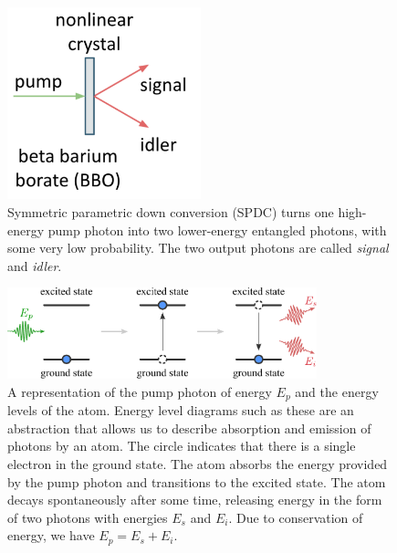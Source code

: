 \begin{figure}[H]
    \centering
    \includegraphics[width=0.5\textwidth]{lesson4/pump.pdf}
    
        \caption[Symmetric parametric down conversion (SPDC)]{Symmetric parametric down conversion (SPDC) turns one high-energy pump photon into two lower-energy entangled photons, with some very low probability. The two output photons are called \emph{signal} and \emph{idler}.}
    \label{fig:spdc}
    
\end{figure}

\begin{figure}[H]
    \centering
    \includegraphics[width=0.8\textwidth]{lesson4/4-8_spdc.pdf}
    
        \caption[pump photon and the energy levels of the atom]{A representation of the pump photon of energy $E_p$ and the energy levels of the atom. Energy level diagrams such as these are an abstraction that allows us to describe absorption and emission of photons by an atom. The circle indicates that there is a single electron in the ground state.
        The atom absorbs the energy provided by the pump photon and transitions to the excited state. The atom decays spontaneously after some time, releasing energy in the form of two photons with energies $E_s$ and $E_i$. Due to conservation of energy, we have $E_p = E_s + E_i$.}
    
    \label{fig:spdc-energy-levels}
\end{figure}

